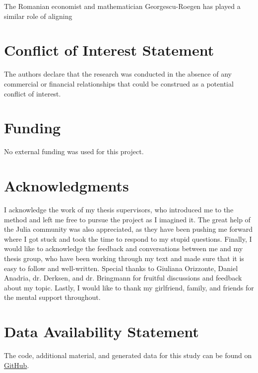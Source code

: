 \documentclass[utf8]{FrontiersinVancouver}
\begin{document}
The Romanian economist and mathematician Georgescu-Roegen has played a similar role of aligning 


\section*{Conflict of Interest Statement}
The authors declare that the research was conducted in the absence of any commercial or financial relationships that could be construed as a potential conflict of interest.

\section*{Funding}
No external funding was used for this project.

\section*{Acknowledgments}
I acknowledge the work of my thesis supervisors, who introduced me to the method and left me free to pursue the project as I imagined it. The great help of the Julia community was also appreciated, as they have been pushing me forward where I got stuck and took the time to respond to my stupid questions. Finally, I would like to acknowledge the feedback and conversations between me and my thesis group, who have been working through my text and made sure that it is easy to follow and well-written. Special thanks to Giuliana Orizzonte, Daniel Anadria, dr. Derksen, and dr. Bringmann for fruitful discussions and feedback about my topic. Lastly, I would like to thank my girlfriend, family, and friends for the mental support throughout.

\section*{Data Availability Statement}
The code, additional material, and generated data for this study can be found on \href{https://github.com/MvanSteenbergen/MasterThesisRQA}{GitHub}.
\end{document}
